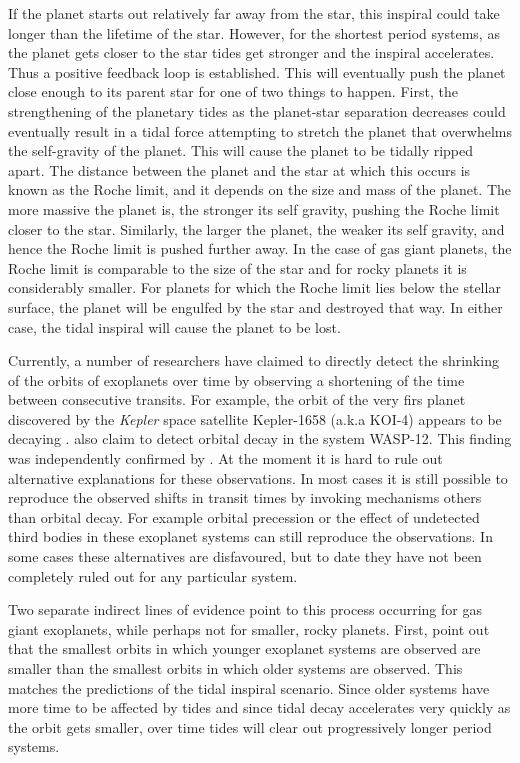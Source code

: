 If the planet starts out relatively far away from the star, this inspiral could
take longer than the lifetime of the star. However, for the shortest period
systems, as the planet gets closer to the star tides get stronger and the
inspiral accelerates. Thus a positive feedback loop is established. This will
eventually push the planet close enough to its parent star for one of two things
to happen. First, the strengthening of the planetary tides as the planet-star
separation decreases could eventually result in a tidal force attempting to
stretch the planet that overwhelms the self-gravity of the planet. This will
cause the planet to be tidally ripped apart. The distance between the planet and
the star at which this occurs is known as the Roche limit, and it depends on the
size and mass of the planet. The more massive the planet is, the stronger its
self gravity, pushing the Roche limit closer to the star.  Similarly, the larger
the planet, the weaker its self gravity, and hence the Roche limit is pushed
further away. In the case of gas giant planets, the Roche limit is comparable to
the size of the star and for rocky planets it is considerably smaller. For
planets for which the Roche limit lies below the stellar surface, the planet
will be engulfed by the star and destroyed that way. In either case, the tidal
inspiral will cause the planet to be lost.

Currently, a number of researchers have claimed to directly detect the shrinking
of the orbits of exoplanets over time by observing a shortening of the time
between consecutive transits. For example, the orbit of the very firs planet
discovered by the \textit{Kepler} space satellite Kepler-1658 (a.k.a KOI-4)
appears to be decaying \citep{Vissapragada_et_al_22}.
\citet{Maciejewski_et_al_16} also claim to detect orbital decay in the system
WASP-12. This finding was independently confirmed by \citet{Patra_et_al_17}. At
the moment it is hard to rule out alternative explanations for these
observations. In most cases it is still possible to reproduce the observed
shifts in transit times by invoking mechanisms others than orbital decay. For
example orbital precession or the effect of undetected third bodies in these
exoplanet systems can still reproduce the observations. In some cases these
alternatives are disfavoured, but to date they have not been completely ruled
out for any particular system.

Two separate indirect lines of evidence point to this process occurring for gas
giant exoplanets, while perhaps not for smaller, rocky planets. First,
\citet{Jackson_et_al_09} point out that the smallest orbits in which younger
exoplanet systems are observed are smaller than the smallest orbits in which
older systems are observed. This matches the predictions of the tidal inspiral
scenario. Since older systems have more time to be affected by tides and since
tidal decay accelerates very quickly as the orbit gets smaller, over time tides
will clear out progressively longer period systems.

